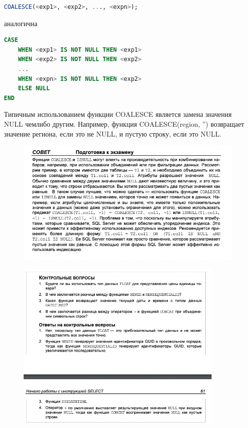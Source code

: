 \begin{lstlisting}[label=lst:funcReturn, language=sql]
	COALESCE(<exp1>, <exp2>, ..., <expn>); 
\end{lstlisting}
аналогична
\begin{lstlisting}[label=lst:funcReturn, language=sql]
CASE
	WHEN <exp1> IS NOT NULL THEN <exp1>
	WHEN <exp2> IS NOT NULL THEN <exp2>
	...
	WHEN <expn> IS NOT NULL THEN <exp2>
	ELSE NULL
END
\end{lstlisting}
Типичным использованием функции COALESCE является замена значения NULL чемлибо другим. Например, функция COALESCE(region, '') возвращает значение региона, если это не NULL, и пустую строку, если это NULL. 

\begin{figure}[h!]
	\begin{center}
		\includegraphics[width=1\textwidth]{img/advice2.png}
	\end{center}
	\captionsetup{justification=centering}
\end{figure}

\begin{figure}[h!]
	\begin{center}
		\includegraphics[width=0.9\textwidth]{img/control7.png}
	\end{center}
	\captionsetup{justification=centering}
\end{figure}

